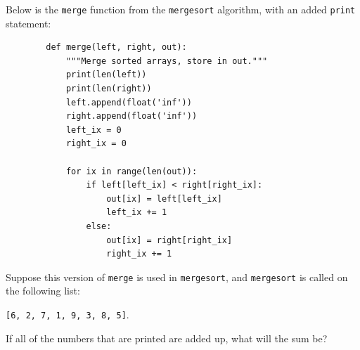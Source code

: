 
\begin{prob}
    Below is the \texttt{merge} function from the \texttt{mergesort} algorithm,
    with an added \texttt{print} statement:

    \begin{verbatim}
        def merge(left, right, out):
            """Merge sorted arrays, store in out."""
            print(len(left))
            print(len(right))
            left.append(float('inf'))
            right.append(float('inf'))
            left_ix = 0
            right_ix = 0

            for ix in range(len(out)):
                if left[left_ix] < right[right_ix]:
                    out[ix] = left[left_ix]
                    left_ix += 1
                else:
                    out[ix] = right[right_ix]
                    right_ix += 1
    \end{verbatim}

    Suppose this version of \texttt{merge} is used in \texttt{mergesort}, and 
    \texttt{mergesort} is called on the following list:


    \texttt{[6, 2, 7, 1, 9, 3, 8, 5]}.

    If all of the numbers that are printed are added up, what will the sum be?

\end{prob}
